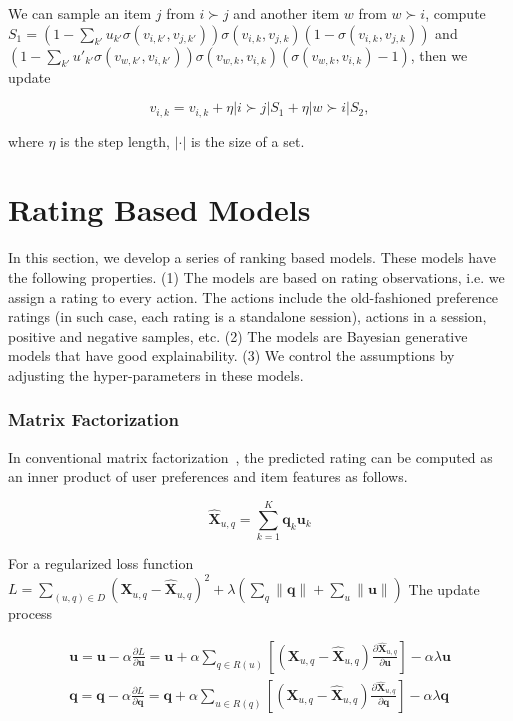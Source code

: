 \documentclass[11pt]{report}
\begin{document}
We can sample an item $j$ from $i\succ j$ and another item $w$ from $w\succ i$,  compute $S_1= (1-\sum_{k'} u_{k'}\sigma(v_{i,k'},v_{j,k'}))\sigma(v_{i,k},v_{j,k})(1-\sigma(v_{i,k},v_{j,k}))$ and $(1-\sum_{k'} u'_{k'}\sigma(v_{w,k'},v_{i,k'}))\sigma(v_{w,k},v_{i,k})(\sigma(v_{w,k},v_{i,k})-1)$, then we update 

\begin{equation}
v_{i,k}=v_{i,k}+\eta |i\succ j| S_1 +\eta |w\succ i| S_2,
\end{equation}

where $\eta$ is the step length, $|\cdot|$ is the size of a set.
 
\part{Rating Based Models}
In this section, we develop a series of ranking based models. These models have the following properties. (1) The models are based on rating observations, i.e. we assign a rating to every action. The actions include the old-fashioned preference ratings (in such case, each rating is a standalone session), actions in a session, positive and negative samples, etc. (2) The models are Bayesian generative models that have good explainability. (3) We control the assumptions by adjusting the hyper-parameters in these models.

\section{Matrix Factorization}

In conventional matrix factorization~\cite{Koren2009Matrix}, the predicted rating can be computed as an inner product of user preferences and item features as follows.

\begin{equation}\label{equ:MF}
 \hat{\mathbf{X}}_{u,q}=\sum_{k=1}^{K} \mathbf{q}_k \mathbf{u}_k
\end{equation}

For a regularized loss function $L=\sum_{(u,q)\in D} ( \mathbf{X}_{u,q}- \hat{\mathbf{X}}_{u,q})^2 + \lambda (\sum_q \| \mathbf{q}\| + \sum_u \| \mathbf{u}\|)$
The update process

\begin{eqnarray}
 \mathbf{u}= \mathbf{u} - \alpha \frac{\partial L}{\partial \mathbf{u}} =  \mathbf{u} +  \alpha \sum_{q\in R(u)}[ (\mathbf{X}_{u,q}- \hat{\mathbf{X}}_{u,q})\frac{\partial \hat{\mathbf{X}}_{u,q}}{\partial \mathbf{u}}] - \alpha\lambda \mathbf{u} \\\nonumber
 \mathbf{q} =  \mathbf{q} - \alpha \frac{\partial L}{\partial \mathbf{q}}=  \mathbf{q} +  \alpha \sum_{u\in R(q)}[ (\mathbf{X}_{u,q}- \hat{\mathbf{X}}_{u,q})\frac{\partial \hat{\mathbf{X}}_{u,q}}{\partial \mathbf{q}}] - \alpha\lambda \mathbf{q} 
\end{eqnarray}
\end{document}
